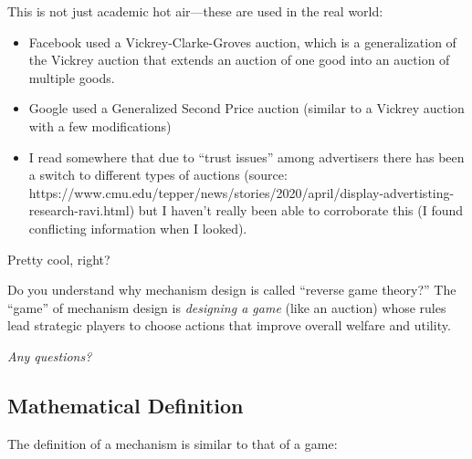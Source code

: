 \documentclass[11pt]{article}
\begin{document}
This is not just academic hot air---these are used in the real world:
\begin{itemize}
    \item Facebook used a Vickrey-Clarke-Groves auction, which is a generalization of the Vickrey auction that extends an auction of one good into an auction of multiple goods.  
    \item Google used a Generalized Second Price auction (similar to a Vickrey auction with a few modifications)
    \item I read somewhere that due to ``trust issues'' among advertisers there has been a switch to different types of auctions (source: https://www.cmu.edu/tepper/news/stories/2020/april/display-advertisting-research-ravi.html) but I haven't really been able to corroborate this (I found conflicting information when I looked).
\end{itemize}

Pretty cool, right? 

Do you understand why mechanism design is called ``reverse game theory?'' The ``game'' of mechanism design is {\it designing a game} (like an auction) whose rules lead strategic players to choose actions that improve overall welfare and utility. 

{\it Any questions?}

\subsection{Mathematical Definition}

The definition of a mechanism is similar to that of a game:
\end{document}
